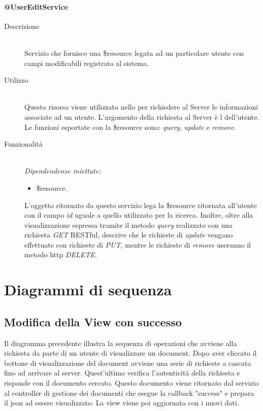 \paragraph{@UserEditService}
\begin{description}
 \item[Descrizione] \hfill \\
 Servizio che fornisce una \$resource legata ad un particolare utente con campi modificabili registrato al sistema.
 \item[Utilizzo] \hfill \\
  Questa risorsa viene utilizzata nello  per richiedere al Server le informazioni associate ad un utente. L'argomento della richiesta al 
  Server è l dell'utente. Le funzioni esportate con la \$resource sono: \textit{query}, \textit{update} e 
  \textit{remove}.
 \item[Funzionalità] \hfill \\
 \emph{Dipendendenze iniettate:}
 \begin{itemize}
  \item \$resource.
 \end{itemize}
  L'oggetto ritornato da questo servizio lega la \$resource ritornata all'utente con il campo 
  \textit{id} uguale a quello utilizzato per la ricerca. Inoltre, oltre alla visualizzazione espressa tramite il metodo \textit{query} realizzato con una richiesta \textit{GET} RESTful, descrive che le richieste di \textit{update} vengano effettuate con richieste di \textit{PUT}, mentre le richieste di \textit{remove} useranno il metodo http \textit{DELETE}.
\end{description}


\newpage


\section{Diagrammi di sequenza}
\label{sequenza}
\subsection{Modifica della View con successo}
Il diagramma precedente illustra la sequenza di operazioni che avviene alla richiesta da parte di un utente di visualizzare un document.
Dopo aver cliccato il bottone di visualizzazione del document avviene una serie di richieste a cascata fino ad arrivare al server. Quest'ultimo verifica l'autenticità della richiesta e risponde con il documento cercato.
Questo documento viene ritornato dal servizio al controller di gestione dei documenti che esegue la callback "success" e prepara il json ad essere visualizzato.
La view viene poi aggiornata con i nuovi dati.

